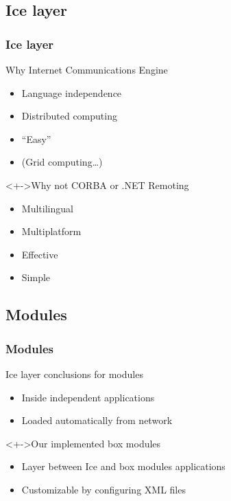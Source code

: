 \documentclass[handout]{beamer}
\begin{document}
\subsection{Ice layer}
\begin{frame}
	\frametitle{Ice layer}
	\begin{block}{Why Internet Communications Engine}
		\begin{itemize}[<+->]
			\item Language independence
			\item Distributed computing
			\item ``Easy''
			\item (Grid computing\dots )
		\end{itemize}
	\end{block}	
	\begin{block}<+->{Why not CORBA or .NET Remoting}
		\begin{itemize}[<+->]
			\item Multilingual
			\item Multiplatform
			\item Effective
			\item Simple
		\end{itemize}
	\end{block}
\end{frame}

\subsection{Modules}
\begin{frame}
	\frametitle{Modules}
	\begin{block}{Ice layer conclusions for modules}
		\begin{itemize}[<+->]
			\item Inside independent applications
			\item Loaded automatically from network
		\end{itemize}
	\end{block}
	\begin{block}<+->{Our implemented box modules}
		\begin{itemize}[<+->]
			\item Layer between Ice and box modules applications
			\item Customizable by configuring XML files
		\end{itemize}
	\end{block}
\end{frame}
\end{document}
